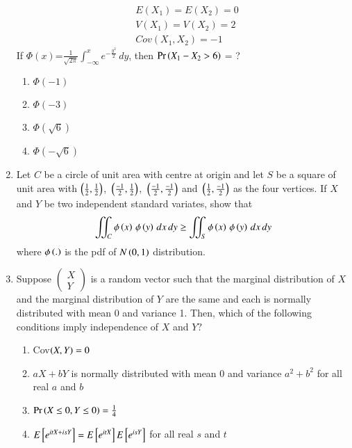 \begin{enumerate}[label=\thesection.\arabic*.,ref=\thesection.\theenumi]
\begin{align}
    &E(X_1)=E(X_2)=0\\
    &V(X_1)=V(X_2)=2\\
    &Cov(X_1,X_2)=-1
\end{align}
If $\Phi(x)$=$\frac{1}{ \sqrt{2\pi}}\int_{-\infty}^{x}e^{-\frac{{y}^2}{2}}\, dy$, then $\Pr\left(X_1-X_2>6\right)$ = ?
\begin{enumerate}
    \item $\Phi(-1)$
    \item $\Phi(-3)$
    \item $\Phi(\sqrt{6})$
    \item $\Phi(-\sqrt{6})$
\end{enumerate}
\solution

%
\item Let $C$ be a circle of unit area with centre at origin and let $S$ be a square of unit area with $\left(\frac{1}{2},\frac{1}{2}\right)$, $\,\left(\frac{-1}{2},\frac{1}{2}\right)$, $\,\left(\frac{-1}{2},\frac{-1}{2}\right)$ and $\,\left(\frac{1}{2},\frac{-1}{2}\right)$ as the four vertices. If $X$ and $Y$ be two independent standard variates, show that
\begin{align*}
    \iint_C{\phi\left(x\right)\,\phi\left(y\right)\,dx\,dy} \geq \iint_S{\phi\left(x\right)\,\phi\left(y\right)\,dx\,dy}
\end{align*}
where $\phi\left(.\right)$ is the pdf of $N\left(0,1\right)$ distribution.
\solution



\item Suppose
$\begin{pmatrix}
X\\
Y
\end{pmatrix}$ is a random vector such that the marginal distribution of $X$ and the marginal distribution of $Y$ are the same and each is normally distributed with mean 0 and variance 1. Then, which of the following conditions imply independence of $X$ and $Y?$
\begin{enumerate}
\item Cov$\left(X,Y\right)=0$
\item $aX+bY$ is normally distributed with mean 0 and variance $a^2+b^2$ for all real $a$ and $b$
\item $\Pr\left(X\le 0, Y\le 0\right)=\frac{1}{4}$
\item $E{}\left[e^{itX+isY}\right]=E{}\left[e^{itX}\right]E{}\left[e^{isY}\right]$ for all real $s$ and $t$
\end{enumerate}
%
\solution


\end{enumerate}